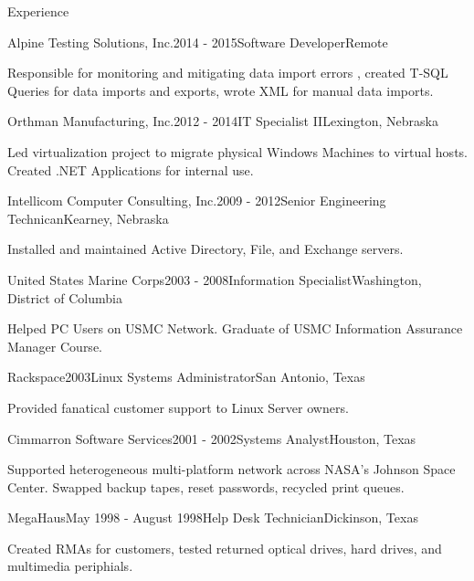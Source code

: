 \documentclass{resume} %
\begin{document}
\begin{rSection}{Experience}
\begin{rSubsection}{Alpine Testing Solutions, Inc.}{2014 - 2015}{Software Developer}{Remote}
\item Responsible for monitoring and mitigating data import errors , created T-SQL Queries for data imports and exports, wrote XML for manual data imports.
\end{rSubsection}

\begin{rSubsection}{Orthman Manufacturing, Inc.}{2012 - 2014}{IT Specialist II}{Lexington, Nebraska}
\item Led virtualization project to migrate physical Windows Machines to virtual hosts. Created .NET Applications for internal use.
\end{rSubsection}

\begin{rSubsection}{Intellicom Computer Consulting, Inc.}{2009 - 2012}{Senior Engineering Technican}{Kearney, Nebraska}
\item Installed and maintained Active Directory, File, and Exchange servers. 
\end{rSubsection}

\begin{rSubsection}{United States Marine Corps}{2003 - 2008}{Information Specialist}{Washington, District of Columbia}
\item Helped PC Users on USMC Network. Graduate of USMC Information Assurance Manager Course.
\end{rSubsection}

\begin{rSubsection}{Rackspace}{2003}{Linux Systems Administrator}{San Antonio, Texas}
\item Provided fanatical customer support to Linux Server owners.
\end{rSubsection}

\begin{rSubsection}{Cimmarron Software Services}{2001 - 2002}{Systems Analyst}{Houston, Texas}
\item Supported heterogeneous multi-platform network across NASA's Johnson Space Center. Swapped backup tapes, reset passwords, recycled print queues.
\end{rSubsection}

\begin{rSubsection}{MegaHaus}{May 1998 - August 1998}{Help Desk Technician}{Dickinson, Texas}
\item Created RMAs for customers, tested returned optical drives, hard drives, and multimedia periphials.
\end{rSubsection}

\end{rSection}
\end{document}

